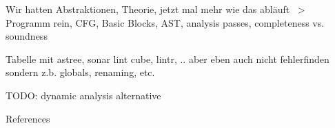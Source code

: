 \documentclass[
   aspectratio=169, %
   10pt, %
   uniqueslidenumber,
   professionalfonts
]{beamer}
\begin{document}
\begin{frame}
   Wir hatten Abstraktionen, Theorie, jetzt mal mehr wie das abläuft
   ~> Programm rein, CFG, Basic Blocks, AST, analysis passes, completeness vs. soundness
\end{frame}

\begin{frame}
   Tabelle mit astree, sonar lint cube, lintr, .. aber eben auch nicht fehlerfinden sondern z.b. globals, renaming, etc.
\end{frame}

\begin{frame}
   TODO: dynamic analysis alternative
\end{frame}


\renewcommand*{\bibfont}{\tiny}

\AtBeginSection{}
\begin{frame}[allowframebreaks]{References}
   \printbibliography[title={}] %
\end{frame}
\end{document}

